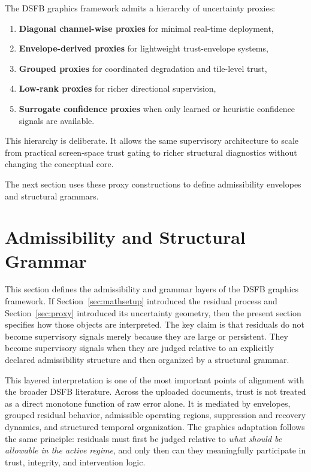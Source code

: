 \documentclass[11pt,letterpaper]{article}
\theoremstyle{gcresult}
\theoremstyle{definition}
\begin{document}
The DSFB graphics framework admits a hierarchy of uncertainty proxies:
\begin{enumerate}[leftmargin=1.5em]
    \item \textbf{Diagonal channel-wise proxies} for minimal real-time deployment,
    \item \textbf{Envelope-derived proxies} for lightweight trust-envelope systems,
    \item \textbf{Grouped proxies} for coordinated degradation and tile-level trust,
    \item \textbf{Low-rank proxies} for richer directional supervision,
    \item \textbf{Surrogate confidence proxies} when only learned or heuristic confidence signals are available.
\end{enumerate}

This hierarchy is deliberate. It allows the same supervisory architecture to scale from practical screen-space trust gating to richer structural diagnostics without changing the conceptual core.

The next section uses these proxy constructions to define admissibility envelopes and structural grammars.

\section{Admissibility and Structural Grammar}
\label{sec:admissibility}

This section defines the admissibility and grammar layers of the DSFB graphics framework. If Section~\ref{sec:mathsetup} introduced the residual process and Section~\ref{sec:proxy} introduced its uncertainty geometry, then the present section specifies how those objects are interpreted. The key claim is that residuals do not become supervisory signals merely because they are large or persistent. They become supervisory signals when they are judged relative to an explicitly declared admissibility structure and then organized by a structural grammar.

This layered interpretation is one of the most important points of alignment with the broader DSFB literature. Across the uploaded documents, trust is not treated as a direct monotone function of raw error alone. It is mediated by envelopes, grouped residual behavior, admissible operating regions, suppression and recovery dynamics, and structured temporal organization. The graphics adaptation follows the same principle: residuals must first be judged relative to \emph{what should be allowable in the active regime}, and only then can they meaningfully participate in trust, integrity, and intervention logic. 
\end{document}
